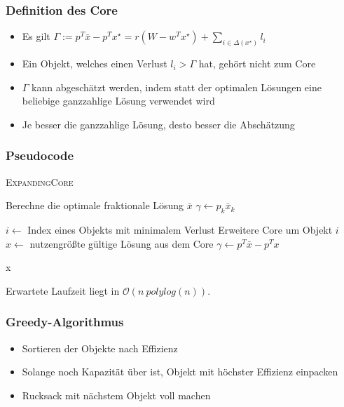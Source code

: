 \documentclass{presentation}
\begin{document}
\begin{frame}
    \frametitle{Definition des Core}
    \begin{itemize}
        \item Es gilt $\Gamma := p^T \bar{x} - p^T x^{\star} = r (W - w^T x^{\star}) + \sum_{i \in \Delta(x^{\star})} l_i$
        \pause

        \item Ein Objekt, welches einen Verlust $l_i > \Gamma$ hat, gehört nicht zum Core
        \pause

        \item $\Gamma$ kann abgeschätzt werden, indem statt der optimalen Lösungen eine beliebige ganzzahlige Lösung verwendet wird
        \pause

        \item Je besser die ganzzahlige Lösung, desto besser die Abschätzung
    \end{itemize}
\end{frame}



\begin{frame}
    \frametitle{Pseudocode}
    \textsc{\large ExpandingCore}
    \begin{algorithmic}[1]

        \State Berechne die optimale fraktionale Lösung $\bar{x}$
        \State $\gamma \gets p_k \bar{x}_k$
        \pause

        \Repeat
            \State $i \gets$ Index eines Objekts mit minimalem Verlust
            \State Erweitere Core um Objekt $i$
            \State $x \gets$ nutzengrößte gültige Lösung aus dem Core
            \State $\gamma \gets p^T \bar{x} - p^T x$
        \pause

        \State \Return x

    \end{algorithmic}

    Erwartete Laufzeit liegt in $\mathcal{O}(n\:polylog(n))$.
\end{frame}



\begin{frame}
\end{frame}



\begin{frame}
    \frametitle{Greedy-Algorithmus}
    \begin{itemize}
        \item Sortieren der Objekte nach Effizienz
        \pause

        \item Solange noch Kapazität über ist, Objekt mit höchster Effizienz einpacken
        \pause

        \item Rucksack mit nächstem Objekt voll machen
    \end{itemize}
\end{frame}
\end{document}
